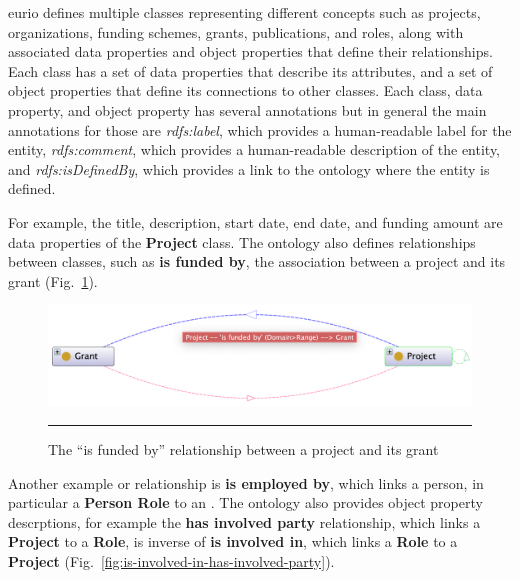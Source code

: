\gls{eurio} defines multiple classes representing different concepts such as projects, organizations, funding schemes, grants, publications, and roles, along with associated data properties and object properties that define their relationships.
Each class has a set of data properties that describe its attributes, and a set of object properties that define its connections to other classes.
Each class, data property, and object property has several annotations but in general the main annotations for those are \textit{rdfs:label}, which provides a human-readable label for the entity, \textit{rdfs:comment}, which provides a human-readable description of the entity, and \textit{rdfs:isDefinedBy}, which provides a link to the ontology where the entity is defined.

For example, the title, description, start date, end date, and funding amount are data properties of the \textbf{Project} class.
The ontology also defines relationships between classes, such as \textbf{is funded by}, the association between a project and its grant (Fig.~\ref{fig:is-funded-by}).

\begin{figure}[htbp]
    \centering
 \includegraphics[width=.9\textwidth]{figures/architecture/is-funded-by.png}
     \rule{35em}{0.5pt}
    \caption{The ``is funded by'' relationship between a project and its grant}
 \label{fig:is-funded-by}
\end{figure}

Another example or relationship is \textbf{is employed by}, which links a person, in particular a \textbf{Person Role} to an .
The ontology also provides object property descrptions, for example the \textbf{has involved party} relationship, which links a \textbf{Project} to a \textbf{Role}, is inverse of \textbf{is involved in}, which links a \textbf{Role} to a \textbf{Project} (Fig.~\ref{fig:is-involved-in-has-involved-party}).

